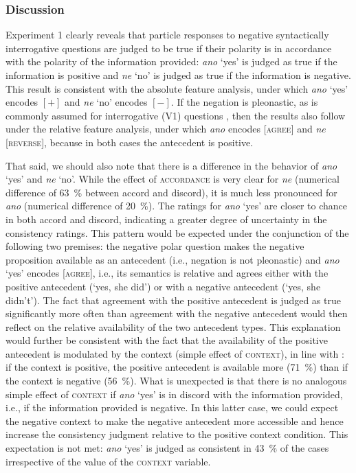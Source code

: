 \documentclass[output=paper,colorlinks,citecolor=brown]{langscibook}
\begin{document}
\subsubsection{Discussion}

Experiment 1 clearly reveals that particle responses to negative syntactically interrogative questions are judged to be true if their polarity is in accordance with the polarity of the information provided: \textit{ano} `yes' is judged as true if the information is positive and \textit{ne} `no' is judged as true if the information is negative. This result is consistent with the absolute feature analysis, under which \textit{ano} `yes' encodes $[+]$ and \textit{ne} `no' encodes $[-]$. If the negation is pleonastic, as is commonly assumed for interrogative (V1) questions \citep{gruet2016yes}, then the results also follow under the relative feature analysis, under which \textit{ano} encodes [\textsc{agree}] and \textit{ne} [\textsc{reverse}], because in both cases the antecedent is positive.

That said, we should also note that there is a difference in the behavior of \textit{ano} `yes' and \textit{ne} `no'. While the effect of \textsc{accordance} is very clear for \textit{ne} (numerical difference of \qty{63}{\percent} between \textsf{accord} and \textsf{discord}), it is much less pronounced for \textit{ano} (numerical difference of \qty{20}{\percent}). The ratings for \textit{ano} `yes' are  closer to chance in both \textsf{accord} and \textsf{discord}, indicating a greater degree of uncertainty in the consistency ratings. This pattern would be expected under the conjunction of the following two premises: the negative polar question makes the negative proposition available as an antecedent (i.e., negation is not pleonastic) and \textit{ano} `yes' encodes \textsc{[agree]}, i.e., its semantics is relative and agrees either with the positive antecedent (`yes, she did') or with a negative antecedent (`yes, she didn't'). The fact that agreement with the positive antecedent is judged as true significantly more often than agreement with the negative antecedent would then reflect on the relative availability of the two antecedent types. This explanation would further be consistent with the fact that the availability of the positive antecedent is modulated by the context (simple effect of \textsc{context}), in line with \citet{hrd+:krifka13}: if the context is positive, the positive antecedent is available more (\qty{71}{\percent}) than if the context is negative (\qty{56}{\percent}). What is unexpected is that there is no analogous simple effect of \textsc{context} if \textit{ano} `yes' is in discord with the information provided, i.e., if the information provided is negative. In this latter case, we could expect the negative context to make the negative antecedent more accessible and hence increase the consistency judgment relative to the positive context condition. This expectation is not met: \textit{ano} `yes' is judged as consistent in \qty{43}{\percent} of the cases irrespective of the value of the \textsc{context} variable.
\end{document}
